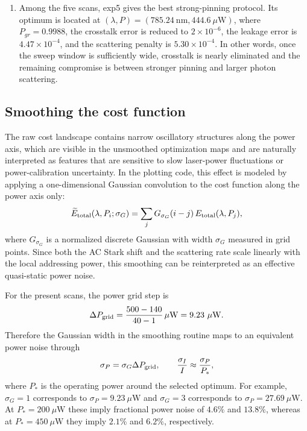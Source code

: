 \documentclass[aps,%
onecolumn,%
floatfix,%
pra,%
amsfonts,%
longbibliography,%
groupedaddress,%
superscriptaddress]{revtex4-2}%
\newcommand{\1}{\mathbbm{1}}
\begin{document}
\begin{enumerate}[label=(\roman*)]
    \item Among the five scans, exp5 gives the best strong-pinning protocol.
    Its optimum is located at
    $(\lambda,P)=(785.24~\mathrm{nm},444.6~\mu\mathrm{W})$, where
    $P_{gr}=0.9988$, the crosstalk error is reduced to
    $2\times 10^{-6}$, the leakage error is
    $4.47\times 10^{-4}$, and the scattering penalty is
    $5.30\times 10^{-4}$. In other words, once the sweep window is sufficiently
    wide, crosstalk is nearly eliminated and the remaining compromise is
    between stronger pinning and larger photon scattering.
\end{enumerate}

\subsection{Smoothing the cost function}

The raw cost landscape contains narrow oscillatory structures along the power
axis, which are visible in the unsmoothed optimization maps and are naturally
interpreted as features that are sensitive to slow laser-power fluctuations or
power-calibration uncertainty. In the plotting code, this effect is modeled by
applying a one-dimensional Gaussian convolution to the cost function along the
power axis only:
\begin{align*}
    \widetilde{E}_{\rm total}(\lambda,P_i;\sigma_G)
    = \sum_j G_{\sigma_G}(i-j)\,E_{\rm total}(\lambda,P_j),
\end{align*}
where $G_{\sigma_G}$ is a normalized discrete Gaussian with width
$\sigma_G$ measured in grid points. Since both the AC Stark shift and the
scattering rate scale linearly with the local addressing power, this smoothing
can be reinterpreted as an effective quasi-static power noise.

For the present scans, the power grid step is
\begin{align*}
    \Delta P_{\rm grid}
    = \frac{500-140}{40-1}\,\mu\mathrm{W}
    = 9.23~\mu\mathrm{W}.
\end{align*}
Therefore the Gaussian width in the smoothing routine maps to an equivalent
power noise through
\begin{align*}
    \sigma_P = \sigma_G \Delta P_{\rm grid},
    \qquad
    \frac{\sigma_I}{I} \approx \frac{\sigma_P}{P_*},
\end{align*}
where $P_*$ is the operating power around the selected optimum. For example,
$\sigma_G=1$ corresponds to $\sigma_P=9.23~\mu\mathrm{W}$ and
$\sigma_G=3$ corresponds to $\sigma_P=27.69~\mu\mathrm{W}$. At
$P_*=200~\mu\mathrm{W}$ these imply fractional power noise of $4.6\%$ and
$13.8\%$, whereas at $P_*=450~\mu\mathrm{W}$ they imply $2.1\%$ and $6.2\%$,
respectively.
\end{document}
